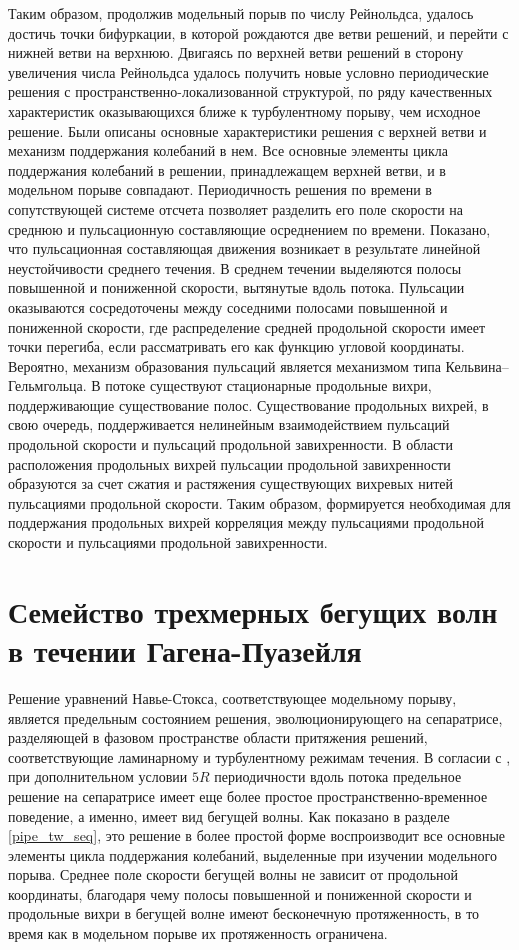 Таким образом, продолжив модельный порыв по числу Рейнольдса, удалось достичь точки бифуркации, в которой рождаются две ветви решений, и перейти с нижней ветви на верхнюю. Двигаясь по верхней ветви решений в сторону увеличения числа Рейнольдса удалось получить новые условно периодические решения с пространственно-локализованной структурой, по ряду качественных характеристик оказывающихся ближе к турбулентному порыву, чем исходное решение. Были описаны основные характеристики решения с верхней ветви и механизм поддержания колебаний в нем. Все основные элементы цикла поддержания колебаний в решении, принадлежащем верхней ветви, и в модельном порыве совпадают. Периодичность решения по времени в сопутствующей системе отсчета позволяет разделить его поле скорости на среднюю и пульсационную составляющие осреднением по времени. Показано, что пульсационная составляющая движения возникает в результате линейной неустойчивости среднего течения. В среднем течении выделяются полосы повышенной и пониженной скорости, вытянутые вдоль потока. Пульсации оказываются сосредоточены между соседними полосами повышенной и пониженной скорости, где распределение средней продольной скорости имеет точки перегиба, если рассматривать его как функцию угловой координаты. Вероятно, механизм образования пульсаций является механизмом типа Кельвина--Гельмгольца. В потоке существуют стационарные продольные вихри, поддерживающие существование полос. Существование продольных вихрей, в свою очередь, поддерживается нелинейным взаимодействием пульсаций продольной скорости и пульсаций продольной завихренности. В области расположения продольных вихрей пульсации продольной завихренности образуются за счет сжатия и растяжения существующих вихревых нитей пульсациями продольной скорости. Таким образом, формируется необходимая для поддержания продольных вихрей корреляция между пульсациями продольной скорости и пульсациями продольной завихренности. 

\section{Семейство трехмерных бегущих волн в течении Гагена-Пуазейля} \label{pipeTW_seq}

Решение уравнений Навье-Стокса, соответствующее модельному порыву, является предельным состоянием решения, эволюционирующего на сепаратрисе, разделяющей в фазовом пространстве области притяжения решений, соответствующие ламинарному и турбулентному режимам течения. В согласии с \cite{Avila2013}, при дополнительном условии $5R$ периодичности вдоль потока предельное решение на сепаратрисе имеет еще более простое пространственно-временное поведение, а именно, имеет вид бегущей волны. Как показано в разделе \ref{pipe_tw_seq}, это решение в более простой форме воспроизводит все основные элементы цикла поддержания колебаний, выделенные при изучении модельного порыва. Среднее поле скорости бегущей волны не зависит от продольной координаты, благодаря чему полосы повышенной и пониженной скорости и продольные вихри в бегущей волне имеют бесконечную протяженность, в то время как в модельном порыве их протяженность ограничена. 

